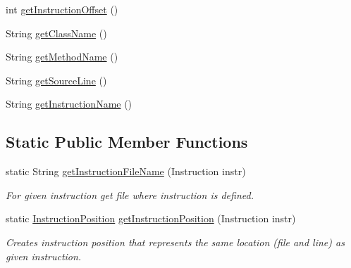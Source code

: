 \begin{DoxyCompactItemize}
\item 
int \hyperlink{classgov_1_1nasa_1_1jpf_1_1inspector_1_1server_1_1breakpoints_1_1_instruction_position_impl_a90b8f38f13ad4fae5c7d56a0545082e8}{get\+Instruction\+Offset} ()
\item 
String \hyperlink{classgov_1_1nasa_1_1jpf_1_1inspector_1_1server_1_1breakpoints_1_1_instruction_position_impl_a9e4b970b369fa44c0be2acb82af0d95e}{get\+Class\+Name} ()
\item 
String \hyperlink{classgov_1_1nasa_1_1jpf_1_1inspector_1_1server_1_1breakpoints_1_1_instruction_position_impl_acda7138bb738489acaed50656e917a50}{get\+Method\+Name} ()
\item 
String \hyperlink{classgov_1_1nasa_1_1jpf_1_1inspector_1_1server_1_1breakpoints_1_1_instruction_position_impl_afd0ba3d86193d415aba5c871979b60f5}{get\+Source\+Line} ()
\item 
String \hyperlink{classgov_1_1nasa_1_1jpf_1_1inspector_1_1server_1_1breakpoints_1_1_instruction_position_impl_acca8b3ac1a32e75b83b12ce339519579}{get\+Instruction\+Name} ()
\end{DoxyCompactItemize}
\subsection*{Static Public Member Functions}
\begin{DoxyCompactItemize}
\item 
static String \hyperlink{classgov_1_1nasa_1_1jpf_1_1inspector_1_1server_1_1breakpoints_1_1_instruction_position_impl_aef02ba722ac5d2bd0674a1062feb4d27}{get\+Instruction\+File\+Name} (Instruction instr)
\begin{DoxyCompactList}\small\item\em For given instruction get file where instruction is defined. \end{DoxyCompactList}\item 
static \hyperlink{interfacegov_1_1nasa_1_1jpf_1_1inspector_1_1interfaces_1_1_instruction_position}{Instruction\+Position} \hyperlink{classgov_1_1nasa_1_1jpf_1_1inspector_1_1server_1_1breakpoints_1_1_instruction_position_impl_a475f560825aa68d3d7df0015bcc63013}{get\+Instruction\+Position} (Instruction instr)
\begin{DoxyCompactList}\small\item\em Creates instruction position that represents the same location (file and line) as given instruction. \end{DoxyCompactList}\end{DoxyCompactItemize}
